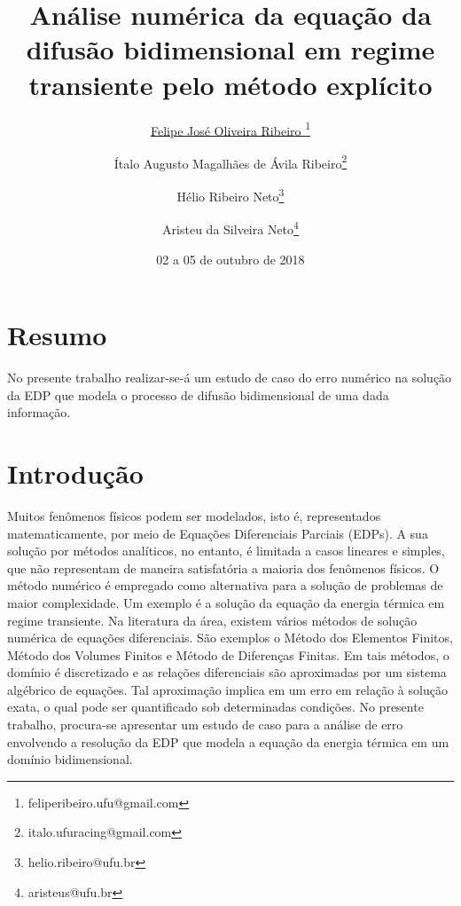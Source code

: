 \documentclass[10pt,twoside,a4paper]{article}
\date{02 a 05 de outubro de 2018}
\title{Análise numérica da equação da difusão bidimensional em regime transiente pelo método explícito}
\author[1]{\underline{Felipe José Oliveira Ribeiro }\thanks{feliperibeiro.ufu@gmail.com}}
\author[1]{Ítalo Augusto Magalhães de Ávila Ribeiro\thanks{italo.ufuracing@gmail.com}}
\author[1]{Hélio Ribeiro Neto\thanks{helio.ribeiro@ufu.br}}
\author[1]{Aristeu da Silveira Neto\thanks{aristeus@ufu.br}}
\affil[1]{FEMEC - Universidade Federal de Uberlândia}
\begin{document}
	\inserirtitulo
	\linespread{1.5}%
	
	\section{Resumo}
	No presente trabalho realizar-se-á um estudo de caso do erro numérico na solução da EDP que modela o processo de difusão bidimensional de uma dada informação. 
	
	
	\section{Introdução} %
	
	Muitos fenômenos físicos podem ser modelados, isto é, representados matematicamente, por meio de Equações Diferenciais Parciais (EDPs). A sua solução por métodos analíticos, no entanto, é limitada a casos lineares e simples, que não representam de maneira satisfatória a maioria dos fenômenos físicos. O método numérico é empregado como alternativa para a solução de problemas de maior complexidade. Um exemplo é a solução da equação da energia térmica em regime transiente. Na literatura da área, existem vários métodos de solução numérica de equações diferenciais. São exemplos o Método dos Elementos Finitos, Método dos Volumes Finitos e Método de Diferenças Finitas. Em tais métodos, o domínio é discretizado e as relações diferenciais são aproximadas por um sistema  algébrico de equações. Tal aproximação implica em um erro em relação à solução exata, o qual pode ser quantificado sob determinadas condições. No presente trabalho, procura-se apresentar um estudo de caso para a análise de erro envolvendo a resolução da EDP que modela a equação da energia térmica em um domínio bidimensional. 
	
	
\end{document}
